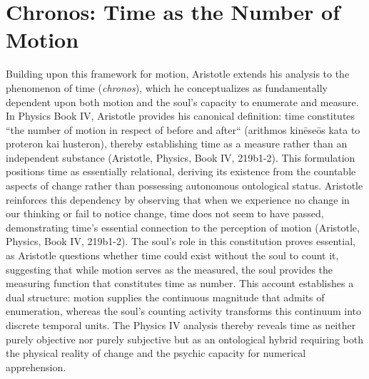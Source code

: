 \documentclass[12pt,a4paper]{article}
\begin{document}
\section{Chronos: Time as the Number of Motion}

Building upon this framework for motion, Aristotle extends his analysis to the phenomenon of time (\textit{chronos}), which he conceptualizes as fundamentally dependent upon both motion and the soul's capacity to enumerate and measure. In Physics Book IV, Aristotle provides his canonical definition: time constitutes ``the number of motion in respect of before and after`` (arithmos kinēseōs kata to proteron kai husteron), thereby establishing time as a measure rather than an independent substance (Aristotle, Physics, Book IV, 219b1-2). This formulation positions time as essentially relational, deriving its existence from the countable aspects of change rather than possessing autonomous ontological status. Aristotle reinforces this dependency by observing that when we experience no change in our thinking or fail to notice change, time does not seem to have passed, demonstrating time's essential connection to the perception of motion (Aristotle, Physics, Book IV, 219b1-2). The soul's role in this constitution proves essential, as Aristotle questions whether time could exist without the soul to count it, suggesting that while motion serves as the measured, the soul provides the measuring function that constitutes time as number. This account establishes a dual structure: motion supplies the continuous magnitude that admits of enumeration, whereas the soul's counting activity transforms this continuum into discrete temporal units. The Physics IV analysis thereby reveals time as neither purely objective nor purely subjective but as an ontological hybrid requiring both the physical reality of change and the psychic capacity for numerical apprehension.
\end{document}
